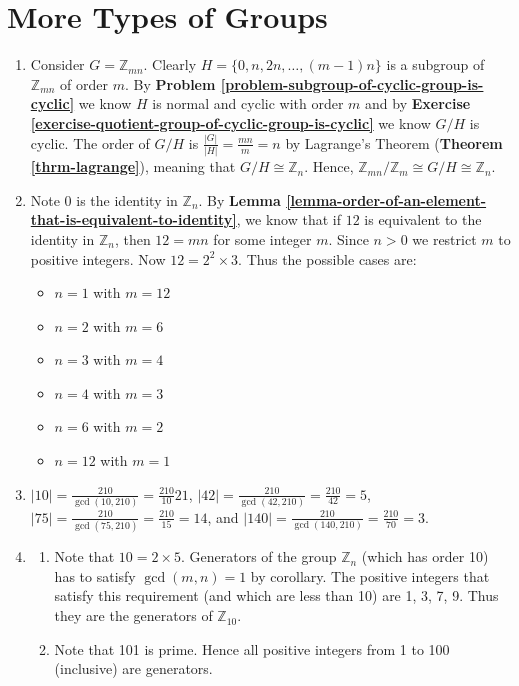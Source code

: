 \section{More Types of Groups}
\begin{enumerate}
    \item Consider $G = \mathbb{Z}_{mn}$. Clearly $H = \{0, n, 2n, \dots, (m-1)n\}$ is a subgroup of $\mathbb{Z}_{mn}$ of order $m$. By \textbf{Problem \ref{problem-subgroup-of-cyclic-group-is-cyclic}} we know $H$ is normal and cyclic with order $m$ and by \textbf{Exercise \ref{exercise-quotient-group-of-cyclic-group-is-cyclic}} we know $G/H$ is cyclic. The order of $G/H$ is $\frac{|G|}{|H|} = \frac{mn}{m} = n$ by Lagrange's Theorem (\textbf{Theorem \ref{thrm-lagrange}}), meaning that $G/H \cong \mathbb{Z}_n$. Hence, $\mathbb{Z}_{mn}/\mathbb{Z}_m \cong G/H \cong \mathbb{Z}_n$.
    
    \item Note 0 is the identity in $\mathbb{Z}_n$. By \textbf{Lemma \ref{lemma-order-of-an-element-that-is-equivalent-to-identity}}, we know that if $12$ is equivalent to the identity in $\mathbb{Z}_n$, then $12 = mn$ for some integer $m$. Since $n > 0$ we restrict $m$ to positive integers. Now $12 = 2^2 \times 3$. Thus the possible cases are:
    \begin{itemize}
        \item $n = 1$ with $m = 12$
        \item $n = 2$ with $m = 6$
        \item $n = 3$ with $m = 4$
        \item $n = 4$ with $m = 3$
        \item $n = 6$ with $m = 2$
        \item $n = 12$ with $m = 1$
    \end{itemize}

    \item $|10| = \frac{210}{\gcd(10, 210)} = \frac{210}{10} 21$, $|42| = \frac{210}{\gcd(42, 210)} = \frac{210}{42} = 5$, $|75| = \frac{210}{\gcd(75, 210)} = \frac{210}{15} = 14$, and $|140| = \frac{210}{\gcd(140, 210)} = \frac{210}{70} = 3$.

    \item \begin{enumerate}[label=(\alph*)]
        \item Note that $10 = 2 \times 5$. Generators of the group $\mathbb{Z}_n$ (which has order 10) has to satisfy $\gcd(m,n) = 1$ by corollary. The positive integers that satisfy this requirement (and which are less than 10) are 1, 3, 7, 9. Thus they are the generators of $\mathbb{Z}_10$.
        \item Note that 101 is prime. Hence all positive integers from 1 to 100 (inclusive) are generators.
    \end{enumerate}


\end{enumerate}
